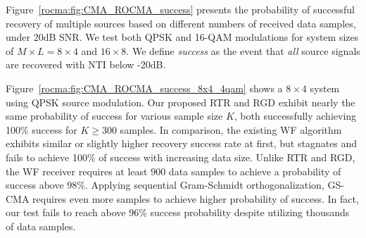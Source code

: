 Figure~\ref{rocma:fig:CMA_ROCMA_success} presents the probability of successful recovery of multiple sources based on
different numbers of received data samples, under $20$dB SNR. We test both QPSK and 16-QAM modulations for system sizes of $M\times L=8\times4$ and $16\times8$. We define \emph{success} as the event that \emph{all} source signals are recovered with NTI below
-20dB.

Figure~\ref{rocma:fig:CMA_ROCMA_success_8x4_4qam} shows a $8\times4$ system using QPSK source
modulation. Our
proposed RTR and RGD exhibit nearly
the same probability of success for various sample size $K$, both successfully
achieving 100\% success for $K\geq300$ samples. In comparison, 
the existing WF algorithm exhibits similar
or slightly higher
recovery success rate at first, but 
stagnates and fails to achieve 100\% of success with increasing data size. Unlike
RTR and RGD, the WF receiver
requires at least $900$ data 
samples to achieve a probability of success above $98\%$. Applying sequential Gram-Schmidt
orthogonalization, GS-CMA requires even more samples to achieve higher probability of
success. In fact, our test fails to
reach above 96\% success probability despite
utilizing thousands of data samples. 

